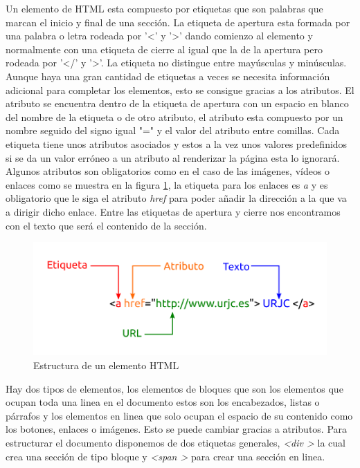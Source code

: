 Un elemento de HTML esta compuesto por etiquetas que son palabras que marcan el inicio y final de una sección. La etiqueta de apertura esta formada por una palabra o letra rodeada por '\textless' y '\textgreater' dando comienzo al elemento y normalmente con una etiqueta de cierre al igual que la de la apertura pero rodeada por '\textless/' y '\textgreater'. La etiqueta no distingue entre mayúsculas y minúsculas. Aunque haya una gran cantidad de etiquetas a veces se necesita información adicional para completar los elementos, esto se consigue gracias a los atributos. El atributo se encuentra dentro de la etiqueta de apertura con un espacio en blanco del nombre de la etiqueta o de otro atributo, el atributo esta compuesto por un nombre seguido del signo igual "=" y el valor del atributo entre comillas. Cada etiqueta tiene unos atributos asociados y estos a la vez unos valores predefinidos si se da un valor erróneo a un atributo al renderizar la página esta lo ignorará. Algunos atributos son obligatorios como en el caso de las imágenes, vídeos o enlaces como se muestra en la figura \ref{fig:elemento}, la etiqueta para los enlaces es \textit{a} y es obligatorio que le siga el atributo \textit{href}  para poder añadir la dirección a la que va a dirigir dicho enlace. Entre las etiquetas de apertura y cierre nos encontramos con el texto que será el contenido de la sección.\cite{etiqueta}


\begin{figure}[H]
    \centering
    \includegraphics[width=12cm, keepaspectratio]{img/elemento.png}
    \caption{Estructura de un elemento HTML}
    \label{fig:elemento}
\end{figure}

Hay dos tipos de elementos, los elementos de bloques que son los elementos que ocupan toda una linea en el documento estos son los encabezados, listas o párrafos y los elementos en linea que solo ocupan el espacio de su contenido como los botones, enlaces o imágenes. Esto se puede cambiar gracias a atributos. Para estructurar el documento disponemos de dos etiquetas generales, \textit{\textless div \textgreater} la cual crea una sección de tipo bloque y \textit{\textless span \textgreater} para crear una sección en linea.\cite{juan2}

